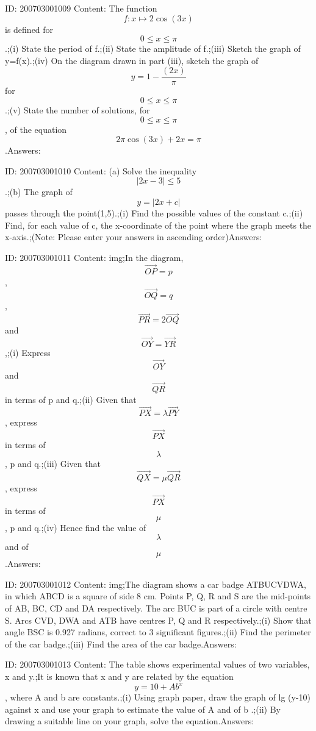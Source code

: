 \documentclass{article}
\begin{document}
ID: 200703001009
Content:
The function $$f:x \mapsto 2\cos (3x)$$ is defined for $$0\leq x\leq \pi$$.;(i) State the period of f.;(ii) State the amplitude of f.;(iii) Sketch the graph of y=f(x).;(iv) On the diagram drawn in part (iii), sketch the graph of $$y=1-\frac{(2x)}{\pi}$$ for $$0\leq x\leq \pi$$.;(v) State the number of solutions, for $$0\leq x\leq\pi$$, of the equation $$2\pi \cos (3x)+2x=\pi$$.Answers:

ID: 200703001010
Content:
(a) Solve the inequality $$|2x-3|\leq5$$.;(b) The graph of $$y=|2x+c|$$ passes through the point(1,5).;(i) Find the possible values of the constant c.;(ii) Find, for each value of c, the x-coordinate of the point where the graph meets the x-axis.;(Note: Please enter your answers in ascending order)Answers:

ID: 200703001011
Content:
img;In the diagram, $$\vec{OP}=p$$, $$\vec{OQ}=q$$, $$\vec{PR}=2\vec{OQ}$$ and $$\vec{OY}=\vec{YR}$$,;(i) Express $$\vec{OY}$$ and $$\vec{QR}$$ in terms of p and q.;(ii) Given that $$\vec{PX}=\lambda \vec{PY}$$, express $$\vec{PX}$$ in terms of $$\lambda$$, p and q.;(iii) Given that $$\vec{QX}=\mu \vec{QR}$$ , express $$\vec{PX}$$ in terms of $$\mu$$, p and q.;(iv) Hence find the value of $$\lambda$$ and of $$\mu$$.Answers:

ID: 200703001012
Content:
img;The diagram shows a car badge ATBUCVDWA, in which ABCD is a square of side 8 cm. Points P, Q, R and S are the mid-points of AB, BC, CD and DA respectively. The arc BUC is part of a circle with centre S. Arcs CVD, DWA and ATB have centres P, Q and R respectively.;(i) Show that angle BSC is 0.927 radians, correct to 3 significant figures.;(ii)	 Find the perimeter of the car badge.;(iii) Find the area of the car badge.Answers:

ID: 200703001013
Content:
The table shows experimental values of two variables, x and y.;It is known that x and y are related by the equation $$y=10+Ab^x$$, where A and b are constants.;(i) Using graph paper, draw the graph of lg (y-10) against x and use your graph to estimate the value of A and of b .;(ii) By drawing a suitable line on your graph, solve the equation.Answers:
\end{document}
